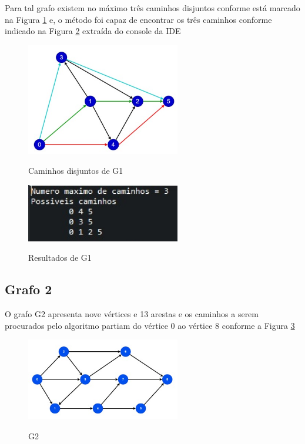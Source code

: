 Para tal grafo existem no máximo três caminhos disjuntos conforme está marcado na Figura \ref{caminhos-grafo1} e, o método foi capaz de encontrar os três caminhos conforme indicado na Figura \ref{solucao-grafo1} extraída do console da IDE

\begin{figure}[H]
    \centering
    \caption{Caminhos disjuntos de G1}
    \includegraphics[width=0.6\textwidth]{figuras/caminhos-grafo1.png}
    \label{caminhos-grafo1}
\end{figure}


\begin{figure}[H]
    \centering
    \caption{Resultados de G1}
    \includegraphics[width=0.6\textwidth]{figuras/solucao-grafo1.png}
    \label{solucao-grafo1}
\end{figure}
    
\subsection{\esp Grafo 2}

O grafo G2 apresenta nove vértices e 13 arestas e os caminhos a serem procurados pelo algoritmo partiam do vértice 0 ao vértice 8 conforme a Figura \ref{grafo2}

\begin{figure}[H]
    \centering
    \caption{G2}
    \includegraphics[width=0.6\textwidth]{figuras/grafo2.png}
    \label{grafo2}
\end{figure}

